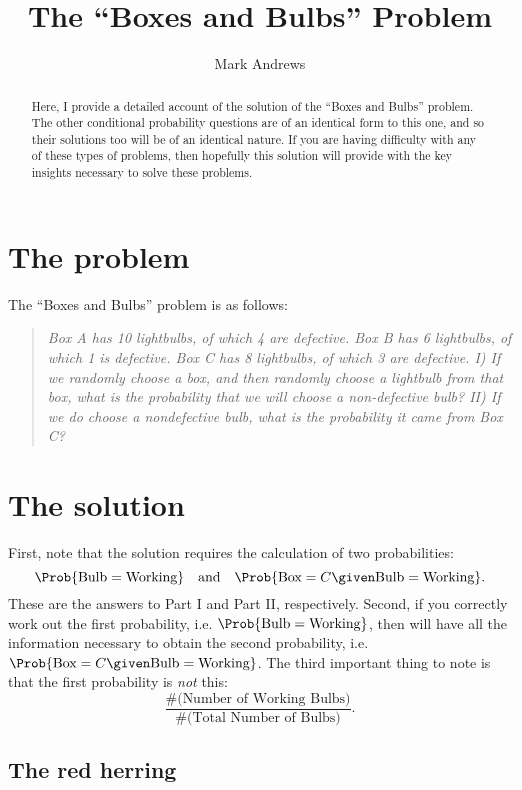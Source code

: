 \documentclass{mjandrews.notes.palatino}
\title{The ``Boxes and Bulbs'' Problem}
\author{Mark Andrews}
\begin{document}
\maketitle
\begin{abstract}
Here, I provide a detailed account of the solution of the ``Boxes and Bulbs''
problem. The other conditional probability questions are of an identical form
to this one, and so their solutions too will be of an identical nature. If you are
having difficulty with any of these types of problems, then hopefully this
solution will provide with the key insights necessary to solve these problems.
\end{abstract}

\section{The problem}

The ``Boxes and Bulbs'' problem is as follows:
\begin{quotation}
{\itshape
Box A has 10 lightbulbs, of which 4 are defective.
Box B has 6 lightbulbs, of which 1 is defective.
Box C has 8 lightbulbs, of which 3 are defective.
I) If we randomly choose a box, and then randomly choose a lightbulb from that box, what is the probability that we will choose a non-defective bulb?
II) If we do choose a nondefective bulb, what is the probability it came from Box C? 
}
\end{quotation}

\section{The solution}

First, note that the solution requires the calculation of two probabilities:
\[
\Prob{\text{Bulb}=\text{Working}} \quad\text{and}\quad \Prob{\text{Box}=C\given\text{Bulb}=\text{Working}}.
\]
These are the answers to Part I and Part II, respectively. Second, if you
correctly work out the first probability, i.e.
$\Prob{\text{Bulb}=\text{Working}}$, then will have all the information
necessary to obtain the second probability, i.e.
$\Prob{\text{Box}=C\given\text{Bulb}=\text{Working}}$. The third important thing to note is that the first probability is \emph{not} this:
\[
\frac{\#(\text{Number of Working Bulbs)}}{\#(\text{Total Number of Bulbs)}}.
\]

\subsection{The red herring}
\end{document}
